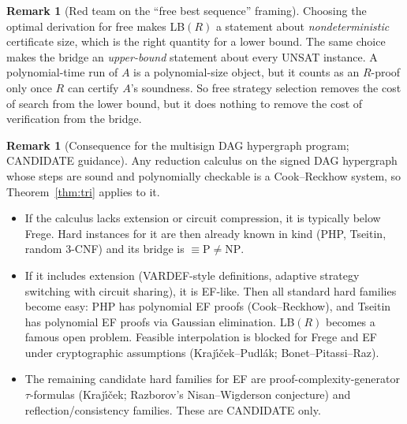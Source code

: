 \documentclass[11pt]{article}
\theoremstyle{definition}\newtheorem{definition}[theorem]{Definition}\newtheorem{remark}[theorem]{Remark}
\begin{document}
\begin{remark}[Red team on the ``free best sequence'' framing]
Choosing the optimal derivation for free makes LB$(R)$ a statement about \emph{nondeterministic} certificate size, which is the right quantity for a lower bound. The same choice makes the bridge an \emph{upper-bound} statement about every UNSAT instance. A polynomial-time run of $A$ is a polynomial-size object, but it counts as an $R$-proof only once $R$ can certify $A$'s soundness. So free strategy selection removes the cost of search from the lower bound, but it does nothing to remove the cost of verification from the bridge.
\end{remark}

\begin{remark}[Consequence for the multisign DAG hypergraph program; CANDIDATE guidance]
Any reduction calculus on the signed DAG hypergraph whose steps are sound and polynomially checkable is a Cook--Reckhow system, so Theorem~\ref{thm:tri} applies to it.
\begin{itemize}
\item If the calculus lacks extension or circuit compression, it is typically below Frege. Hard instances for it are then already known in kind (PHP, Tseitin, random 3-CNF) and its bridge is $\equiv\mathrm P\ne\mathrm{NP}$.
\item If it includes extension (VARDEF-style definitions, adaptive strategy switching with circuit sharing), it is EF-like. Then all standard hard families become easy: PHP has polynomial EF proofs (Cook--Reckhow), and Tseitin has polynomial EF proofs via Gaussian elimination. LB$(R)$ becomes a famous open problem. Feasible interpolation is blocked for Frege and EF under cryptographic assumptions (Kraj\'{\i}\v{c}ek--Pudl\'ak; Bonet--Pitassi--Raz).
\item The remaining candidate hard families for EF are proof-complexity-generator $\tau$-formulas (Kraj\'{\i}\v{c}ek; Razborov's Nisan--Wigderson conjecture) and reflection/consistency families. These are CANDIDATE only.
\end{itemize}
\end{remark}
\end{document}
